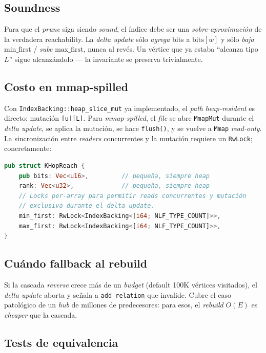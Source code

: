 \subsection{Soundness}

Para que el \emph{prune} siga siendo \emph{sound}, el índice debe ser
una \emph{sobre-aproximación} de la verdadera reachability. La
\emph{delta update} sólo \emph{agrega} bits a \(\mathrm{bits}[w]\) y
sólo \emph{baja} \(\mathrm{min\_first}\) / \emph{sube}
\(\mathrm{max\_first}\), nunca al revés. Un vértice que ya estaba
``alcanza tipo \(L\)'' sigue alcanzándolo --- la invariante se
preserva trivialmente.

\subsection{Costo en mmap-spilled}

Con \texttt{IndexBacking::heap\_slice\_mut} ya implementado, el
\emph{path} \emph{heap-resident} es directo: mutación \texttt{[u][L]}.
Para \emph{mmap-spilled}, el \emph{file} se abre \texttt{MmapMut}
durante el \emph{delta update}, se aplica la mutación, se hace
\texttt{flush()}, y se vuelve a \texttt{Mmap} \emph{read-only}. La
sincronización entre \emph{readers} concurrentes y la mutación
requiere un \texttt{RwLock}; concretamente:

\begin{lstlisting}[language=Rust]
pub struct KHopReach {
    pub bits: Vec<u16>,         // pequeña, siempre heap
    rank: Vec<u32>,             // pequeña, siempre heap
    // Locks per-array para permitir reads concurrentes y mutación
    // exclusiva durante el delta update.
    min_first: RwLock<IndexBacking<[i64; NLF_TYPE_COUNT]>>,
    max_first: RwLock<IndexBacking<[i64; NLF_TYPE_COUNT]>>,
}
\end{lstlisting}

\subsection{Cuándo fallback al rebuild}

Si la cascada \emph{reverse} crece más de un \emph{budget}
(default 100K vértices visitados), el \emph{delta update} aborta y
señala a \texttt{add\_relation} que invalide. Cubre el caso
patológico de un \emph{hub} de millones de predecesores: para esos,
el \emph{rebuild} \(O(E)\) es \emph{cheaper} que la cascada.

\subsection{Tests de equivalencia}

